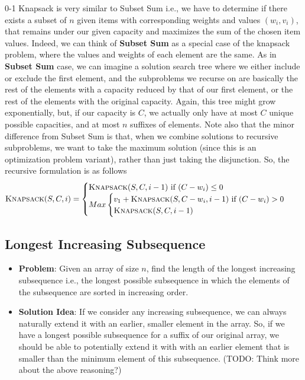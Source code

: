 \documentclass[10pt,a4paper]{article}
\begin{document}
0-1 Knapsack is very similar to Subset Sum i.e., we have to determine if there exists a subset of $n$ given items with corresponding weights and values $(w_i,v_i)$, that remains under our given capacity and maximizes the sum of the chosen item values. Indeed, we can think of \textbf{Subset Sum} as a special case of the knapsack problem, where the values and weights of each element are the same. As in \textbf{Subset Sum} case, we can imagine a solution search tree where we either include or exclude the first element, and the subproblems we recurse on are basically the rest of the elements with a capacity reduced by that of our first element, or the rest of the elements with the original capacity. Again, this tree might grow exponentially, but, if our capacity is $C$, we actually only have at most $C$ unique possible capacities, and at most $n$ suffixes of elements. Note also that the minor difference from Subset Sum is that, when we combine solutions to recursive subproblems, we want to take the maximum solution (since this is an optimization problem variant), rather than just taking the disjunction. So, the recursive formulation is as follows
\begin{align*}
    &\textsc{Knapsack}(S,C,i) = 
    \begin{cases}
        \textsc{Knapsack}(S,C, i-1) \text{ if } (C-w_i) \leq 0 \\
        Max
        \begin{cases}
            v_1 + \textsc{Knapsack}(S,C-w_i,i-1) \text{ if } (C-w_i) > 0 \\
            \textsc{Knapsack}(S,C,i-1) \\
        \end{cases}
    \end{cases}\\
\end{align*}

\subsection*{Longest Increasing Subsequence}
\begin{itemize}
    \item \textbf{Problem}: Given an array of size $n$, find the length of the longest increasing subsequence i.e., the longest possible subsequence in which the elements of the subsequence are sorted in increasing order.
    \item \textbf{Solution Idea}: If we consider any increasing subsequence, we can always naturally extend it with an earlier, smaller element in the array. So, if we have a longest possible subsequence for a suffix of our original array, we should be able to potentially extend it with with an earlier element that is smaller than the minimum element of this subsequence. (TODO: Think more about the above reasoning?)
\end{itemize}
\end{document}
